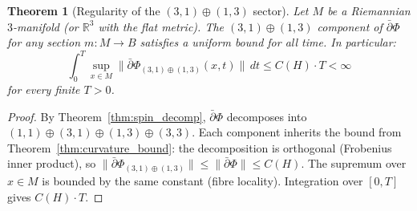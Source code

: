 \documentclass[11pt,a4paper]{article}
\newtheorem{theorem}{Theorem}[section]
\theoremstyle{definition}
\theoremstyle{remark}
\newcommand{\R}{\mathbb{R}}
\newcommand{\dbar}{\bar{\partial}}
\begin{document}
\begin{theorem}[Regularity of the $(3,1)\oplus(1,3)$ sector]\label{thm:regularity}
Let $M$ be a Riemannian $3$-manifold (or $\R^3$ with the flat metric). The $(3,1)\oplus(1,3)$ component of $\dbar\Phi$ for any section $m:M\to B$ satisfies a uniform bound for all time. In particular:
\begin{equation}\label{eq:bkm}
\int_0^T\!\sup_{x\in M}\|\dbar\Phi_{(3,1)\oplus(1,3)}(x,t)\|\,dt\leq C(H)\cdot T<\infty
\end{equation}
for every finite $T>0$.
\end{theorem}

\begin{proof}
By Theorem~\ref{thm:spin_decomp}, $\dbar\Phi$ decomposes into $(1,1)\oplus(3,1)\oplus(1,3)\oplus(3,3)$. Each component inherits the bound from Theorem~\ref{thm:curvature_bound}: the decomposition is orthogonal (Frobenius inner product), so $\|\dbar\Phi_{(3,1)\oplus(1,3)}\|\leq\|\dbar\Phi\|\leq C(H)$. The supremum over $x\in M$ is bounded by the same constant (fibre locality). Integration over $[0,T]$ gives $C(H)\cdot T$.
\end{proof}
\end{document}
